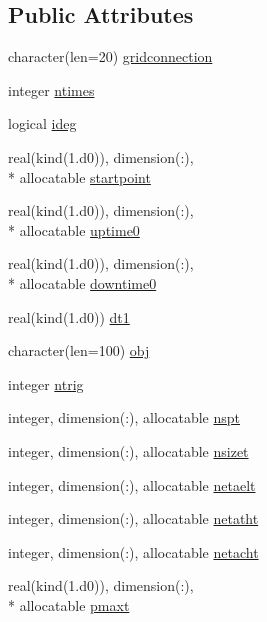 \subsection*{Public Attributes}
\begin{DoxyCompactItemize}
\item 
character(len=20) \hyperlink{classinputvar_a8488f705094b7c59cf8cb06939fe9a7a}{gridconnection}
\item 
integer \hyperlink{classinputvar_a98d384e0347fb055110c18572dbdb522}{ntimes}
\item 
logical \hyperlink{classinputvar_a62235e6c8b16a98c1aea10ac01e11ac9}{ideg}
\item 
real(kind(1.d0)), dimension(\-:), \\*
allocatable \hyperlink{classinputvar_a8a730b8445d97ba3812647c22689dc01}{startpoint}
\item 
real(kind(1.d0)), dimension(\-:), \\*
allocatable \hyperlink{classinputvar_a3e87ba90459e069a492fde778f06b6a3}{uptime0}
\item 
real(kind(1.d0)), dimension(\-:), \\*
allocatable \hyperlink{classinputvar_ab7b48e990ab724feb4e8d6297d3cd63c}{downtime0}
\item 
real(kind(1.d0)) \hyperlink{classinputvar_a8d3f282e92e7ea93ad6b14576bc3458b}{dt1}
\item 
character(len=100) \hyperlink{classinputvar_ab5d2f467a214e31204c18a24582b81bb}{obj}
\item 
integer \hyperlink{classinputvar_ae4403f5c5b16bf2cbd2b607a87e5ee9a}{ntrig}
\item 
integer, dimension(\-:), allocatable \hyperlink{classinputvar_a0c86e9a7915872ee547e5bd8802611e7}{nspt}
\item 
integer, dimension(\-:), allocatable \hyperlink{classinputvar_ad358835680a10ce32616f8262e7dea05}{nsizet}
\item 
integer, dimension(\-:), allocatable \hyperlink{classinputvar_a2bfcb389a7fba156b8c1146150a71f51}{netaelt}
\item 
integer, dimension(\-:), allocatable \hyperlink{classinputvar_acebcf3d64f116183dd364e920288729f}{netatht}
\item 
integer, dimension(\-:), allocatable \hyperlink{classinputvar_a7f82eda09f512dfe2f28f82efc5187ad}{netacht}
\item 
real(kind(1.d0)), dimension(\-:), \\*
allocatable \hyperlink{classinputvar_a4f173bcabd7673493639dfa0ad700822}{pmaxt}

\end{DoxyCompactItemize}
